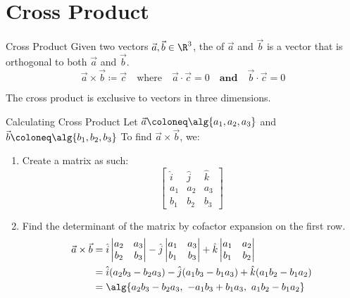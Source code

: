 \documentclass[12pt]{report}
\begin{document}
\section{Cross Product}

\begin{dfnbox}{Cross Product}{}
    Given two vectors $\vec{a}, \vec{b} \in \R^3$, the  of $\vec{a}$ and $\vec{b}$ is a vector that is orthogonal to both $\vec{a}$ and $\vec{b}$.
    \tcblower
    \[ \vec{a} \times \vec{b} \coloneq \vec{c} \quad \text{where} \quad \vec{a} \cdot \vec{c} = 0 \quad \textbf{and} \quad \vec{b} \cdot \vec{c} = 0 \]
\end{dfnbox}

The cross product is exclusive to vectors in three dimensions.

\begin{tecbox}{Calculating Cross Product}{}
Let $\vec{a} \coloneq \alg{a_1, a_2, a_3}$ and $\vec{b} \coloneq \alg{b_1, b_2, b_3}$ To find $\vec{a} \times \vec{b}$, we:
\begin{enumerate}
    \item Create a matrix as such:
    \[ \begin{bmatrix}
        \hat{i} & \hat{j} & \hat{k} \\
        a_1 & a_2 & a_3 \\
        b_1 & b_2 & b_3
    \end{bmatrix} \]
    \item Find the determinant of the matrix by cofactor expansion on the first row.
    \begin{align*}
        \vec{a} \times \vec{b} &= \hat{i} \begin{vmatrix} a_2 & a_3 \\ b_2 & b_3 \end{vmatrix} - \hat{j} \begin{vmatrix} a_1 & a_3 \\ b_1 & b_3 \end{vmatrix} + \hat{k} \begin{vmatrix} a_1 & a_2 \\ b_1 & b_2 \end{vmatrix} \\
        &= \hat{i}(a_2b_3 - b_2a_3) - \hat{j}(a_1b_3 - b_1a_3) + \hat{k}(a_1b_2 - b_1a_2) \\
        &= \alg{ a_2b_3 - b_2a_3 ,\  -a_1b_3 + b_1a_3 ,\  a_1b_2 - b_1a_2 }
    \end{align*}
\end{enumerate}
\end{tecbox}
\end{document}
